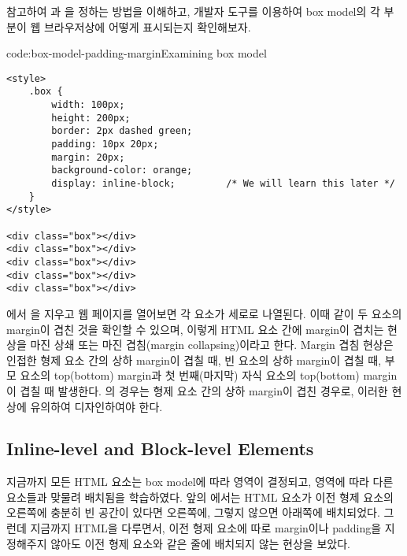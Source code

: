 \을 참고하여 과 을 정하는 방법을 이해하고, 개발자 도구를 이용하여 box model의 각 부분이 웹 브라우저상에 어떻게 표시되는지 확인해보자.

\begin{code}{code:box-model-padding-margin}{Examining box model}
\begin{verbatim}
<style>
    .box {
        width: 100px;
        height: 200px;
        border: 2px dashed green;
        padding: 10px 20px;
        margin: 20px;
        background-color: orange;
        display: inline-block;         /* We will learn this later */
    }
</style>

<div class="box"></div>
<div class="box"></div>
<div class="box"></div>
<div class="box"></div>
<div class="box"></div>
\end{verbatim}
\end{code}

에서 을 지우고 웹 페이지를 열어보면 각  요소가 세로로 나열된다. 이때 \과 같이 두 요소의 margin이 겹친 것을 확인할 수 있으며, 이렇게 HTML 요소 간에 margin이 겹치는 현상을 마진 상쇄 또는 마진 겹침(margin collapsing)이라고 한다. Margin 겹침 현상은 인접한 형제 요소 간의 상하 margin이 겹칠 때, 빈 요소의 상하 margin이 겹칠 때, 부모 요소의 top(bottom) margin과 첫 번째(마지막) 자식 요소의 top(bottom) margin이 겹칠 때 발생한다. 의 경우는 형제 요소 간의 상하 margin이 겹친 경우로, 이러한 현상에 유의하여 디자인하여야 한다.


\subsection*{Inline-level and Block-level Elements}

지금까지 모든 HTML 요소는 box model에 따라 영역이 결정되고, 영역에 따라 다른 요소들과 맞물려 배치됨을 학습하였다. 앞의 에서는 HTML 요소가 이전 형제 요소의 오른쪽에 충분히 빈 공간이 있다면 오른쪽에, 그렇지 않으면 아래쪽에 배치되었다. 그런데 지금까지 HTML을 다루면서, 이전 형제 요소에 따로 margin이나 padding을 지정해주지 않아도 이전 형제 요소와 같은 줄에 배치되지 않는 현상을 보았다.

